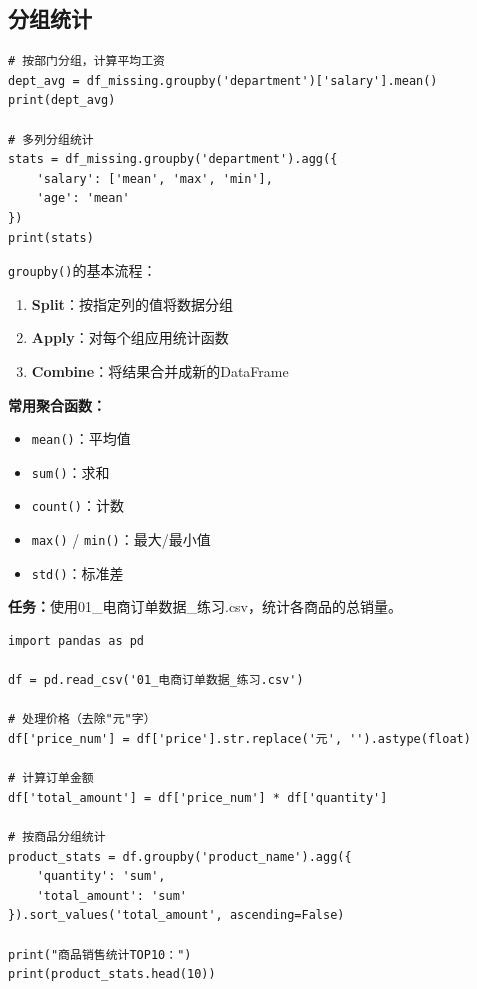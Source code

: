 \documentclass[12pt,a4paper]{article}
\begin{document}
\subsection{分组统计}

\begin{lstlisting}[caption={按部门统计工资}]
# 按部门分组，计算平均工资
dept_avg = df_missing.groupby('department')['salary'].mean()
print(dept_avg)

# 多列分组统计
stats = df_missing.groupby('department').agg({
    'salary': ['mean', 'max', 'min'],
    'age': 'mean'
})
print(stats)
\end{lstlisting}

\begin{knowledgebox}[groupby()详解]
\texttt{groupby()}的基本流程：
\begin{enumerate}
    \item \textbf{Split}：按指定列的值将数据分组
    \item \textbf{Apply}：对每个组应用统计函数
    \item \textbf{Combine}：将结果合并成新的DataFrame
\end{enumerate}

\textbf{常用聚合函数：}
\begin{itemize}
    \item \texttt{mean()}：平均值
    \item \texttt{sum()}：求和
    \item \texttt{count()}：计数
    \item \texttt{max()} / \texttt{min()}：最大/最小值
    \item \texttt{std()}：标准差
\end{itemize}
\end{knowledgebox}

\begin{practicebox}
\textbf{任务：}使用01\_电商订单数据\_练习.csv，统计各商品的总销量。

\begin{lstlisting}
import pandas as pd

df = pd.read_csv('01_电商订单数据_练习.csv')

# 处理价格（去除"元"字）
df['price_num'] = df['price'].str.replace('元', '').astype(float)

# 计算订单金额
df['total_amount'] = df['price_num'] * df['quantity']

# 按商品分组统计
product_stats = df.groupby('product_name').agg({
    'quantity': 'sum',
    'total_amount': 'sum'
}).sort_values('total_amount', ascending=False)

print("商品销售统计TOP10：")
print(product_stats.head(10))
\end{lstlisting}
\end{practicebox}
\end{document}
